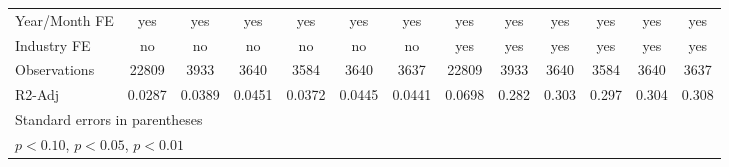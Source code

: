 {\begin{tabular}{l*{12}{c}}
\hline
Year/Month FE       &         yes         &         yes         &         yes         &         yes         &         yes         &         yes         &         yes         &         yes         &         yes         &         yes         &         yes         &         yes         \\
Industry FE         &          no         &          no         &          no         &          no         &          no         &          no         &         yes         &         yes         &         yes         &         yes         &         yes         &         yes         \\
Observations        &       22809         &        3933         &        3640         &        3584         &        3640         &        3637         &       22809         &        3933         &        3640         &        3584         &        3640         &        3637         \\
R2-Adj              &      0.0287         &      0.0389         &      0.0451         &      0.0372         &      0.0445         &      0.0441         &      0.0698         &       0.282         &       0.303         &       0.297         &       0.304         &       0.308         \\
\hline\hline
\multicolumn{13}{l}{\footnotesize Standard errors in parentheses}\\
\multicolumn{13}{l}{\footnotesize \sym{*} \(p<0.10\), \sym{**} \(p<0.05\), \sym{***} \(p<0.01\)}\\
\end{tabular}
}
